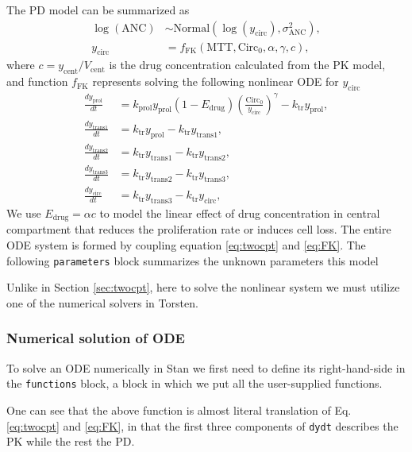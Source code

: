 The PD model can be summarized as
\begin{align*}
  \log(\text{ANC})& \sim \text{Normal}(\log(y_{\text{circ}}), \sigma^2_{\text{ANC}}),  \\
  y_{\text{circ}}& = f_{\text{FK}}(\text{MTT}, \text{Circ}_{0}, \alpha, \gamma, c),
\end{align*}
where $c=y_{\text{cent}}/V_{\text{cent}}$ is the drug concentration calculated from the PK model, and function $f_{\text{FK}}$ represents solving  the following
nonlinear ODE for $y_{\text{circ}}$ 
\begin{subequations}\label{eq:FK}
\begin{align}
  \frac{dy_\mathrm{prol}}{dt} &= k_\mathrm{prol} y_\mathrm{prol} (1 - E_\mathrm{drug})\left(\frac{\text{Circ}_0}{y_\mathrm{circ}}\right)^\gamma - k_\mathrm{tr}y_\mathrm{prol}, \\
  \frac{dy_\mathrm{trans1}}{dt} &= k_\mathrm{tr} y_\mathrm{prol} - k_\mathrm{tr} y_\mathrm{trans1}, \\
  \frac{dy_\mathrm{trans2}}{dt} &= k_\mathrm{tr} y_\mathrm{trans1} - k_\mathrm{tr} y_\mathrm{trans2},  \\
  \frac{dy_\mathrm{trans3}}{dt} &= k_\mathrm{tr} y_\mathrm{trans2} - k_\mathrm{tr} y_\mathrm{trans3},  \\
  \frac{dy_\mathrm{circ}}{dt} &= k_\mathrm{tr} y_\mathrm{trans3} - k_\mathrm{tr} y_\mathrm{circ},
\end{align}
\end{subequations}
We use $E_{\text{drug}} = \alpha c$ to model the linear effect of drug
concentration in central compartment that reduces the proliferation rate or induces cell loss. The entire ODE system is formed by coupling equation \eqref{eq:twocpt}
and \eqref{eq:FK}.
The following \texttt{parameters} block summarizes the unknown parameters this model


Unlike in Section \ref{sec:twocpt}, here to solve the nonlinear system we must
utilize one of the numerical solvers in Torsten.

\subsubsection{Numerical solution of ODE}
To solve an ODE numerically in Stan we first need to define
its right-hand-side in the \texttt{functions} block, a block in which
we put all the user-supplied functions.

One can see that the above function is almost literal translation of
Eq. \eqref{eq:twocpt} and \eqref{eq:FK}, in that the first three
components of \texttt{dydt} describes the PK while the rest the
PD.

